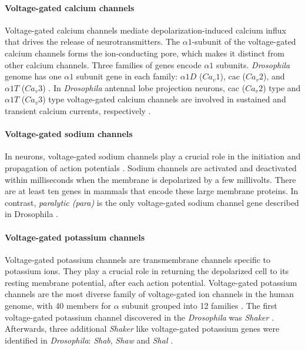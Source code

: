 \paragraph{Voltage-gated calcium channels}
Voltage-gated calcium channels mediate depolarization-induced calcium influx that drives the release of neurotransmitters. The $\alpha1$-subunit of the voltage-gated calcium channels forms the ion-conducting pore, which makes it distinct from other calcium channels. Three families of genes encode $\alpha1$ subunits. \textit{Drosophila} genome has one $\alpha1$ subunit gene in each family: $\alpha1D$ ($Ca_{v}1$), cac ($Ca_{v}2$), and $\alpha1T$ ($Ca_{v}3$) \parencite{Littleton2000, King2007}. In \textit{Drosophila} antennal lobe projection neurons, cac ($Ca_{v}2$) type and $\alpha1T$ ($Ca_{v}3$) type voltage-gated calcium channels are involved in sustained and transient calcium currents, respectively \parencite{Gu2009, Iniguez2013}.

\paragraph{Voltage-gated sodium channels}
In neurons, voltage-gated sodium channels play a crucial role in the initiation and propagation of action potentials \parencite{Hodgkin1952}. Sodium channels are activated and deactivated within milliseconds when the membrane is depolarized by a few millivolts. There are at least ten genes in mammals that encode these large membrane proteins. In contrast, \textit{paralytic (para)} is the only voltage-gated sodium channel gene described in Drosophila \parencite{Piggott2019}. %

\paragraph{Voltage-gated potassium channels}
Voltage-gated potassium channels are transmembrane channels specific to potassium ions. They play a crucial role in returning the depolarized cell to its resting membrane potential, after each action potential. Voltage-gated potassium channels are the most diverse family of voltage-gated ion channels in the human genome, with 40 members for $\alpha$ subunit grouped into 12 families \parencite{Gutman2005}. The first voltage-gated potassium channel discovered in the \textit{Drosophila} was \textit{Shaker} \parencite{Papazian1987}. Afterwards, three additional \textit{Shaker} like voltage-gated potassium genes were identified in \textit{Drosophila}: \textit{Shab}, \textit{Shaw} and \textit{Shal} \parencite{Covarrubias1991}. 

